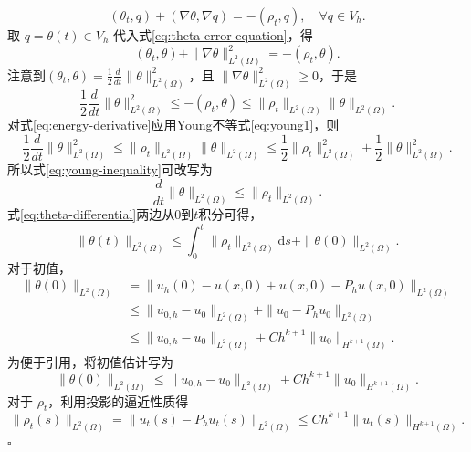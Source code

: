 \documentclass{GZUbachelorthesis}
\makeatletter
\renewcommand{\proofname}{证明}
\renewenvironment{proof}[1][\proofname]{\par
	\normalfont
	\topsep6\p@\@plus6\p@\relax
	\trivlist
	\setlength{\itemindent}{2em}%
	\item[\hskip\labelsep{\songti #1：}]\ignorespaces
}{\hfill\ensuremath{\square}\endtrivlist\@endpefalse}
\theoremstyle{chineseplain}
\makeatother
\begin{document}
\begin{proof}
	\begin{equation}
		(\theta_t, q)+(\nabla \theta, \nabla q)=-(\rho_t,q), \quad \forall q \in V_h. 
		\label{eq:theta-error-equation}
	\end{equation}
	取 $q=\theta(t) \in V_h$ 代入式\eqref{eq:theta-error-equation}，得
	\[
	(\theta_t, \theta) + \|\nabla \theta\|_{L^2(\Omega)}^2 = -(\rho_t, \theta).
	\]
	注意到$(\theta_t, \theta)=\frac{1}{2} \frac{d}{dt} \|\theta\|_{L^2(\Omega)}^2$，且 $\|\nabla \theta\|_{L^2(\Omega)}^2 \geq 0$，于是
	\begin{equation}
		\frac{1}{2} \frac{d}{dt} \|\theta\|_{L^2(\Omega)}^2 \leq -(\rho_t, \theta) \leq \|\rho_t\|_{L^2(\Omega)} \|\theta\|_{L^2(\Omega)}.
		\label{eq:energy-derivative}
	\end{equation}
	对式\eqref{eq:energy-derivative}应用Young不等式\eqref{eq:young1}，则
	\begin{equation}
		\frac{1}{2}\frac{d}{dt}\|\theta\|^2_{L^2(\Omega)} \leq \|\rho_t\|_{L^2(\Omega)}\|\theta\|_{L^2(\Omega)} \leq \frac{1}{2}\|\rho_t\|^2_{L^2(\Omega)}+\frac{1}{2}\|\theta\|^2_{L^2(\Omega)}.
		\label{eq:young-inequality}
	\end{equation}
	所以式\eqref{eq:young-inequality}可改写为
	\begin{equation}
		\frac{d}{dt}\|\theta\|_{L^2(\Omega)} \leq \|\rho_t\|_{L^2(\Omega)}.
		\label{eq:theta-differential}
	\end{equation}
	式\eqref{eq:theta-differential}两边从0到$t$积分可得，
	\begin{equation}
		\|\theta(t)\|_{L^2(\Omega)} \leq \int_0^t \|\rho_t\|_{L^2(\Omega)} \mathrm{d}s+\|\theta(0) \|_{L^2(\Omega)}. 
		\label{eq:theta-integral}
	\end{equation}
	对于初值，
	\[
	\begin{aligned}
		\|\theta(0)\|_{L^2(\Omega)}
		&= \|u_h(0) - u(x,0) + u(x,0) - P_h u(x,0)\|_{L^2(\Omega)} \\
		&\leq \|u_{0,h} - u_0\|_{L^2(\Omega)} + \|u_0 - P_h u_0\|_{L^2(\Omega)} \\
		&\leq \|u_{0,h} - u_0\|_{L^2(\Omega)} + C h^{k+1} \|u_0\|_{H^{k+1}(\Omega)}.
	\end{aligned}
	\]
	为便于引用，将初值估计写为
	\begin{equation}
		\|\theta(0)\|_{L^2(\Omega)} \leq \|u_{0,h} - u_0\|_{L^2(\Omega)} + C h^{k+1} \|u_0\|_{H^{k+1}(\Omega)}.
		\label{eq:theta-initial}
	\end{equation}
	对于 $\rho_t$，利用投影的逼近性质得
	\begin{equation}
		\|\rho_t(s)\|_{L^2(\Omega)} = \|u_t(s) - P_h u_t(s)\|_{L^2(\Omega)} \leq C h^{k+1} \|u_t(s)\|_{H^{k+1}(\Omega)}.

\end{equation}
\end{proof}
\end{document}
